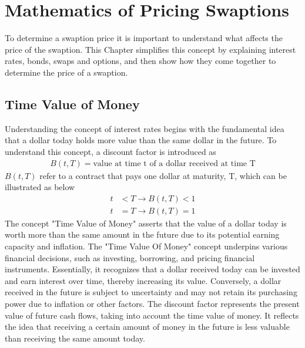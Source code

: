 \section{Mathematics of Pricing Swaptions}
To determine a swaption price it is important to understand what affects the price of the swaption. 
This Chapter simplifies this concept by explaining interest rates, bonds, swaps and options, 
and then show how they come together to determine the price of a swaption.
\subsection{Time Value of Money}
Understanding the concept of interest rates begins with the fundamental idea that a dollar today holds 
more value than the same dollar in the future. To understand this concept, a discount factor is introduced as 
\begin{align*}
    B(t,T) = \text{value at time t of a dollar received at time T}
\end{align*} 
$B(t,T)$ refer to a contract that pays one dollar at maturity, T, which can be illustrated as below
\begin{align*}
    t & < T \rightarrow B(t,T) < 1 \\
    t & = T \rightarrow B(t,T) = 1
\end{align*}
The concept "Time Value of Money" asserts that the value of a dollar today is worth more than
the same amount in the future due to its potential earning capacity and inflation.
The "Time Value Of Money" concept underpins various financial decisions, such as investing, borrowing,
and pricing financial instruments. Essentially, it recognizes that a dollar received today can be invested 
and earn interest over time, thereby increasing its value. Conversely, a dollar received in the future
is subject to uncertainty and may not retain its purchasing power due to inflation or other factors.
The discount factor represents the present value of future cash flows, taking into account the time value of money.
It reflects the idea that receiving a certain amount of money in the future is less valuable than receiving 
the same amount today.
